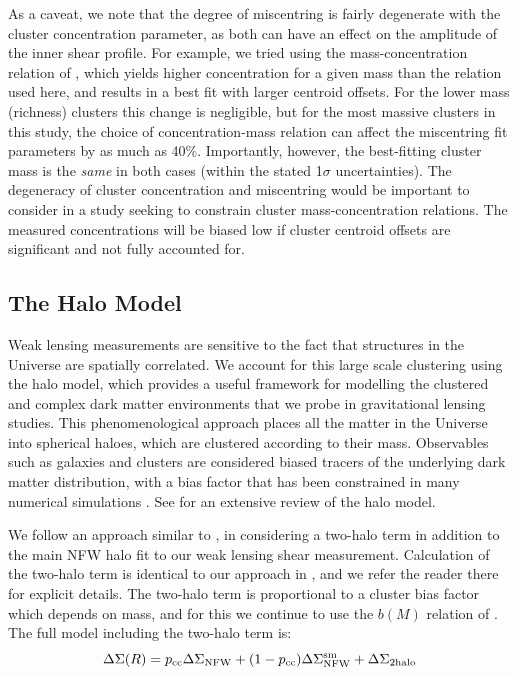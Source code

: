 As a caveat, we note that the degree of miscentring is fairly degenerate with the cluster concentration parameter, as both can have an effect on the amplitude of the inner shear profile. For example, we tried using the mass-concentration relation of \citet{Prada12}, which yields higher concentration for a given mass than the \citet{Dutton14} relation used here, and results in a best fit with larger centroid offsets. For the lower mass (richness) clusters this change is negligible, but for the most massive clusters in this study, the choice of concentration-mass relation can affect the miscentring fit parameters by as much as 40\%. Importantly, however, the best-fitting cluster mass is the {\it same} in both cases (within the stated 1$\sigma$ uncertainties). The degeneracy of cluster concentration and miscentring would be important to consider in a study seeking to constrain cluster mass-concentration relations. The measured concentrations will be biased low if cluster centroid offsets are significant and not fully accounted for.



\subsection{The Halo Model}
\label{sec:halomodel}
Weak lensing measurements are sensitive to the fact that structures in the Universe are spatially correlated. We account for this large scale clustering using the halo model, which provides a useful framework for modelling the clustered and complex dark matter environments that we probe in gravitational lensing studies. This phenomenological approach places all the matter in the Universe into spherical haloes, which are clustered according to their mass. Observables such as galaxies and clusters are considered biased tracers of the underlying dark matter distribution, with a bias factor that has been constrained in many numerical simulations \citep[e.g.][]{Mo96,Sheth99,Tinker10}. See \citet{Cooray02} for an extensive review of the halo model.

We follow an approach similar to \citet{Johnston07}, in considering a two-halo term in addition to the main \ac{NFW} halo fit to our weak lensing shear measurement. Calculation of the two-halo term is identical to our approach in \citet{Ford14}, and we refer the reader there for explicit details. The two-halo term is proportional to a cluster bias factor which depends on mass, and for this we continue to use the $b(M)$ relation of \citet{Seljak04}. The full model including the two-halo term is:
\begin{equation}
\Delta\Sigma(R) = p_{\mathrm{cc}}\Delta\Sigma_{\mathrm{NFW}} +(1-p_{\mathrm{cc}})\Delta\Sigma_{\mathrm{NFW}}^{\rm sm} + \Delta\Sigma_{\mathrm{2halo}}
\label{modelEQ}
\end{equation}

